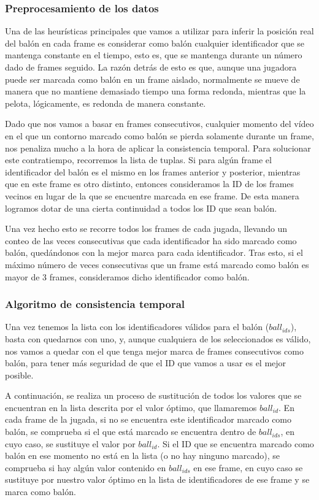 \subsubsection*{Preprocesamiento de los datos}
Una de las heurísticas principales que vamos a utilizar para inferir la posición real del balón en cada frame es considerar como balón cualquier identificador que se mantenga constante en el tiempo, esto es, que se mantenga durante un número dado de frames seguido. La razón detrás de esto es que, aunque una jugadora puede ser marcada como balón en un frame aislado, normalmente se mueve de manera que no mantiene demasiado tiempo una forma redonda, mientras que la pelota, lógicamente, es redonda de manera constante.

Dado que nos vamos a basar en frames consecutivos, cualquier momento del vídeo en el que un contorno marcado como balón se pierda solamente durante un frame, nos penaliza mucho a la hora de aplicar la consistencia temporal. Para solucionar este contratiempo, recorremos la lista de tuplas. Si para algún frame el identificador del balón es el mismo en los frames anterior y posterior, mientras que en este frame es otro distinto, entonces consideramos la ID de los frames vecinos en lugar de la que se encuentre marcada en ese frame. De esta manera logramos dotar de una cierta continuidad a todos los ID que sean balón.

Una vez hecho esto se recorre todos los frames de cada jugada, llevando un conteo de las veces consecutivas que cada identificador ha sido marcado como balón, quedándonos con la mejor marca para cada identificador. Tras esto, si el máximo número de veces consecutivas que un frame está marcado como balón es mayor de 3 frames, consideramos dicho identificador como balón. 

\subsubsection*{Algoritmo de consistencia temporal}
Una vez tenemos la lista con los identificadores válidos para el balón ($ball_{ids}$), basta con quedarnos con uno, y, aunque cualquiera de los seleccionados es válido, nos vamos a quedar con el que tenga mejor marca de frames consecutivos como balón, para tener más seguridad de que el ID que vamos a usar es el mejor posible.

A continuación, se realiza un proceso de sustitución de todos los valores que se encuentran en la lista descrita por el valor óptimo, que llamaremos $ball_{id}$. En cada frame de la jugada, si no se encuentra este identificador marcado como balón, se comprueba si el que está marcado se encuentra dentro de $ball_{ids}$, en cuyo caso, se sustituye el valor por $ball_{id}$. Si el ID que se encuentra marcado como balón en ese momento no está en la lista (o no hay ninguno marcado), se comprueba si hay algún valor contenido en $ball_{ids}$ en ese frame, en cuyo caso se sustituye por nuestro valor óptimo en la lista de identificadores de ese frame y se marca como balón.

